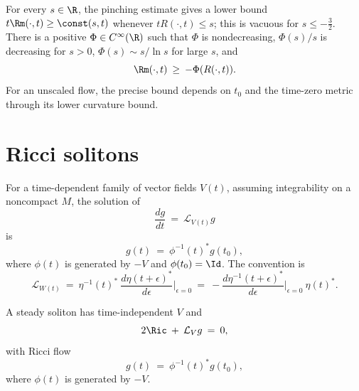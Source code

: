 For every $s\in\R$, the pinching estimate gives a lower bound
$t\Rm(\cdot,t)\geq\const(s,t)$ whenever $tR(\cdot,t)\leq s$; this is
vacuous for $s\leq-\frac32$. There is a positive
$\Phi\in C^\infty(\R)$ such that $\Phi$ is nondecreasing,
$\Phi(s)/s$ is decreasing for $s>0$, $\Phi(s)\sim s/\ln s$ for large $s$,
and
\begin{equation} \label{phi}
\Rm(\cdot,t)\: \ge \:-\Phi(R(\cdot,t)).
\end{equation}
For an unscaled flow, the precise bound depends on $t_0$ and the time-zero
metric through its lower curvature bound.

\section{Ricci solitons} \label{Riccisolitons}

For a time-dependent family of vector fields $V(t)$, assuming integrability
on a noncompact $M$, the solution of
\begin{equation}
\frac{dg}{dt}\:=\:{\mathcal L}_{V(t)}g
\end{equation}
is
\begin{equation}
g(t)\:=\:\phi^{-1}(t)^*g(t_0),
\end{equation}
where $\phi(t)$ is generated by $-V$ and $\phi(t_0)=\Id$. The convention is
\begin{equation}
{\mathcal L}_{W(t)}\:=\:\eta^{-1}(t)^*\:
\frac{d\eta(t+\epsilon)^*}{d\epsilon}\Big|_{\epsilon=0}
\:=\:-\frac{d\eta^{-1}(t+\epsilon)^*}{d\epsilon}\Big|_{\epsilon=0}\:\eta(t)^*.
\end{equation}

A steady soliton has time-independent $V$ and
\begin{equation}
2\Ric\:+\:{\mathcal L}_Vg\:=\:0,
\end{equation}
with Ricci flow
\begin{equation}
g(t)\:=\:\phi^{-1}(t)^*g(t_0),
\end{equation}
where $\phi(t)$ is generated by $-V$.

